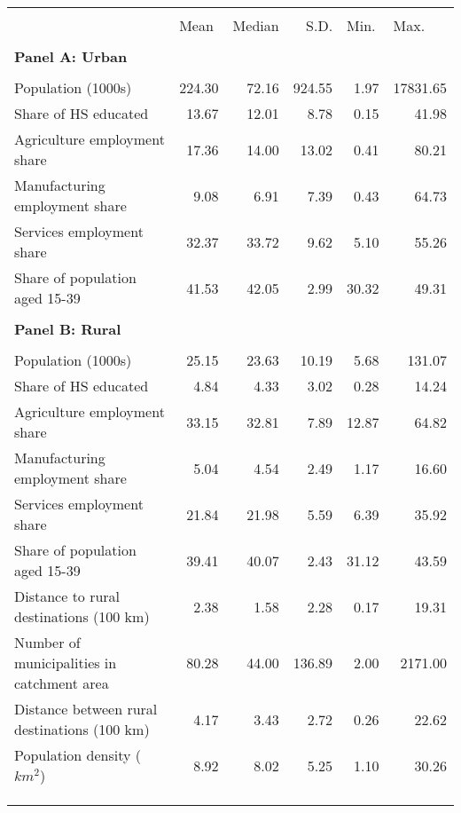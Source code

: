 \begin{tabular}{lrrrrr}
\toprule &       &       &       &       &  \\
      & \multicolumn{1}{l}{Mean} & \multicolumn{1}{l}{Median} & \multicolumn{1}{p{4.75em}}{S.D.} & \multicolumn{1}{l}{Min.} & \multicolumn{1}{l}{Max.} \bigstrut[b]\\
\cline{2-6}      &       &       &       &       &  \bigstrut[t]\\
\textbf{Panel A: Urban} &       &       &       &       &  \\
      &       &       &       &       &  \\
Population (1000s) & 224.30 & 72.16 & 924.55 & 1.97  & 17831.65 \\
Share of HS educated & 13.67 & 12.01 & 8.78  & 0.15  & 41.98 \\
Agriculture employment share & 17.36 & 14.00 & 13.02 & 0.41  & 80.21 \\
Manufacturing employment share & 9.08  & 6.91  & 7.39  & 0.43  & 64.73 \\
Services employment share & 32.37 & 33.72 & 9.62  & 5.10  & 55.26 \\
Share of population aged 15-39 & 41.53 & 42.05 & 2.99  & 30.32 & 49.31 \\
      &       &       &       &       &  \\
\textbf{Panel B: Rural } &       &       &       &       &  \\
      &       &       &       &       &  \\
Population (1000s) & 25.15 & 23.63 & 10.19 & 5.68  & 131.07 \\
Share of HS educated & 4.84  & 4.33  & 3.02  & 0.28  & 14.24 \\
Agriculture employment share & 33.15 & 32.81 & 7.89  & 12.87 & 64.82 \\
Manufacturing employment share & 5.04  & 4.54  & 2.49  & 1.17  & 16.60 \\
Services employment share & 21.84 & 21.98 & 5.59  & 6.39  & 35.92 \\
Share of population aged 15-39 & 39.41 & 40.07 & 2.43  & 31.12 & 43.59 \\
Distance to rural destinations (100 km) & 2.38  & 1.58  & 2.28  & 0.17  & 19.31 \\
Number of municipalities in catchment area & 80.28 & 44.00 & 136.89 & 2.00  & 2171.00 \\
Distance between rural destinations (100 km) & 4.17  & 3.43  & 2.72  & 0.26  & 22.62 \\
Population density ($km^2$) & 8.92  & 8.02  & 5.25  & 1.10  & 30.26 \\
      &       &       &       &       &  \\
      &       &       &       &       &  \\
\bottomrule &       &       &       &       &  \\
\end{tabular}%
